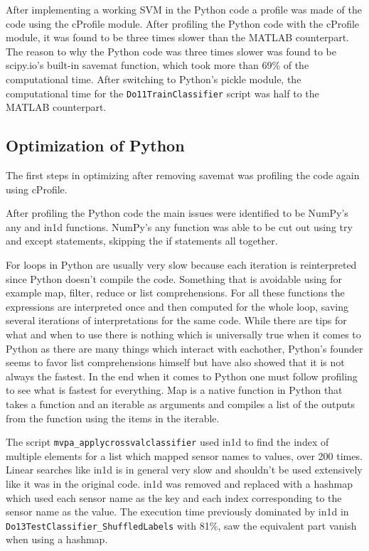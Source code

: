 \documentclass[12pt, a4paper]{article}
\begin{document}
After implementing a working SVM in the Python code a profile was made of the code using the cProfile module.
After profiling the Python code with the cProfile module, it was found to be three times slower than the MATLAB counterpart.
The reason to why the Python code was three times slower was found to be scipy.io's built-in savemat function, which took more than 69\% of the computational time.
After switching to Python's pickle module, the computational time for the \texttt{Do11TrainClassifier} script was half to the MATLAB counterpart. %

\subsection{Optimization of Python}
The first steps in optimizing after removing savemat was profiling the code again using cProfile.

After profiling the Python code the main issues were identified to be NumPy's any and in1d functions.
NumPy's any function was able to be cut out using try and except statements, skipping the if statements all together.%

For loops in Python are usually very slow because each iteration is reinterpreted since Python doesn't compile the code.
Something that is avoidable using for example map, filter, reduce or list comprehensions. 
For all these functions the expressions are interpreted once and then computed for the whole loop, saving several iterations of interpretations for the same code. 
While there are tips for what and when to use there is nothing which is universally true when it comes to Python as there are many things which interact with eachother, Python's founder seems to favor list comprehensions himself but have also showed that it is not always the fastest.
In the end when it comes to Python one must follow profiling to see what is fastest for everything.
Map is a native function in Python that takes a function and an iterable as arguments and compiles a list of the outputs from the function using the items in the iterable.

The script \texttt{mvpa\_applycrossvalclassifier} used in1d to find the index of multiple elements for a list which mapped sensor names to values, over 200 times.
Linear searches like in1d is in general very slow and shouldn't be used extensively like it was in the original code.
in1d was removed and replaced with a hashmap which used each sensor name as the key and each index corresponding to the sensor name as the value.
The execution time previously dominated by in1d in \texttt{Do13TestClassifier\_ShuffledLabels} with 81\%, saw the equivalent part vanish when using a hashmap.
\end{document}
